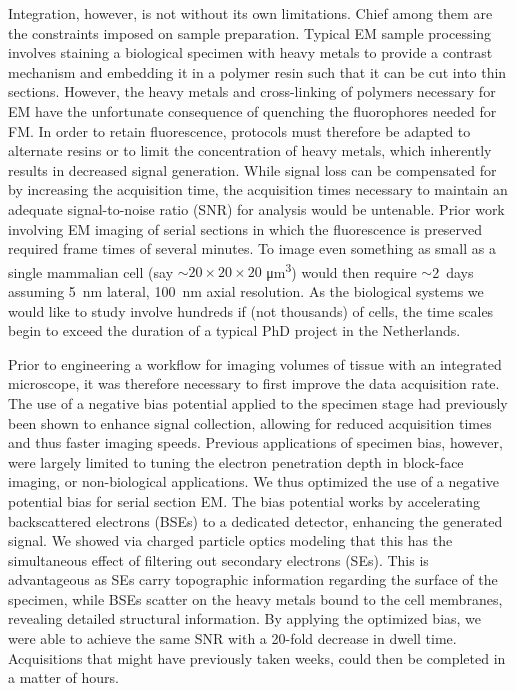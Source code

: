 Integration, however, is not without its own limitations. Chief among them are the constraints imposed on sample preparation. Typical EM sample processing involves staining a biological specimen with heavy metals to provide a contrast mechanism and embedding it in a polymer resin such that it can be cut into thin sections. However, the heavy metals and cross-linking of polymers necessary for EM have the unfortunate consequence of quenching the fluorophores needed for FM. In order to retain fluorescence, protocols must therefore be adapted to alternate%
resins or to limit the concentration of heavy metals, which inherently results in decreased signal generation. While signal loss can be compensated for by increasing the acquisition time, the acquisition times necessary to maintain an adequate signal-to-noise ratio (SNR) for analysis would be untenable. Prior work involving EM imaging of serial sections in which the fluorescence is preserved required frame times of several minutes. To image even something as small as a single mammalian cell (say ${\sim}\text{20} \times \text{20} \times \text{20}$ \si{\micro\meter^3}) would then require ${\sim}$\SI{2}{days} assuming \SI{5}{\nano\meter} lateral, \SI{100}{\nano\meter} axial resolution. As the biological systems we would like to study involve hundreds if (not thousands) of cells, the time scales begin to exceed the duration of a typical PhD project in the Netherlands.

Prior to engineering a workflow for imaging volumes of tissue with an integrated microscope, it was therefore necessary to first improve the data acquisition rate. The use of a negative bias potential applied to the specimen stage had previously been shown to enhance signal collection, allowing for reduced acquisition times and thus faster imaging speeds. Previous applications of specimen bias, however, were largely limited to tuning the electron penetration depth in block-face imaging, or non-biological applications. We thus optimized the use of a negative potential bias for serial section EM. The bias potential works by accelerating backscattered electrons (BSEs) to a dedicated detector, enhancing the generated signal. We showed via charged particle optics modeling that this has the simultaneous effect of filtering out secondary electrons (SEs). This is advantageous as SEs carry topographic information regarding the surface of the specimen, while BSEs scatter on the heavy metals bound to the cell membranes, revealing detailed structural information. By applying the optimized bias, we were able to achieve the same SNR with a 20-fold decrease in dwell time. Acquisitions that might have previously taken weeks, could then be completed in a matter of hours.

